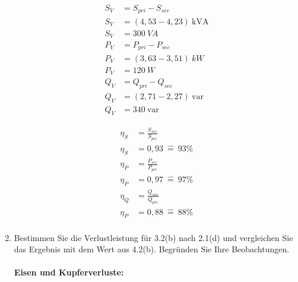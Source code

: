 \begin{enumerate}[label=\alph*)]
	      \begin{minipage}[r]{0.5\linewidth}
		      \begin{align*}
			      S_{V} & = S_{pri} - S_{sec}         \\
			      S_{V} & = (4,53 - 4,23)\ \text{kVA} \\
			      S_{V} & = 300\ VA                   \\
			      P_{V} & = P_{pri} - P_{sec}         \\
			      P_{V} & = (3,63 - 3,51)\ kW         \\
			      P_{V} & = 120\ W                    \\
			      Q_{V} & = Q_{pri} - Q_{sec}         \\
			      Q_{V} & = (2,71 - 2,27)\ \text{var} \\
			      Q_{V} & = 340\ \text{var}
		      \end{align*}
	      \end{minipage}
	      \begin{minipage}[l]{0.5\linewidth}
		      \begin{align*}
			      \eta_S & = \frac{S_{sec}}{S_{pri}} \\
			      \eta_S & = 0,93\ \widehat{=}\ 93\% \\
			      \eta_P & = \frac{P_{sec}}{P_{pri}} \\
			      \eta_P & = 0,97\ \widehat{=}\ 97\% \\
			      \eta_Q & = \frac{Q_{sec}}{Q_{pri}} \\
			      \eta_P & = 0,88\ \widehat{=}\ 88\% \\
		      \end{align*}
	      \end{minipage}
	      \pagebreak

	\item Bestimmen Sie die Verlustleistung für 3.2(b) nach 2.1(d) und vergleichen Sie
	      das Ergebnis mit dem Wert aus 4.2(b). Begründen Sie Ihre Beobachtungen.\\ \ \\
	      \textbf{Eisen und Kupferverluste:}\\ \ \\
	      \begin{tcolorbox}[colback=gray!30,
			      colframe=black,
			      width=0.9\textwidth,
		      ]
		      \parbox{\textwidth}{

}
\end{tcolorbox}
\end{enumerate}
